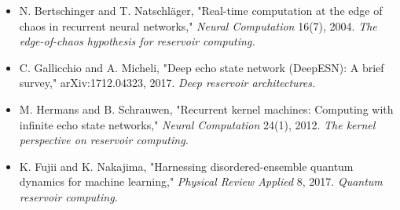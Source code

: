 \begin{itemize}[nosep]
  \item N. Bertschinger and T. Natschläger, "Real-time computation at the edge of chaos in recurrent neural networks," \textit{Neural Computation} 16(7), 2004. \textit{The edge-of-chaos hypothesis for reservoir computing.}
  \item C. Gallicchio and A. Micheli, "Deep echo state network (DeepESN): A brief survey," arXiv:1712.04323, 2017. \textit{Deep reservoir architectures.}
  \item M. Hermans and B. Schrauwen, "Recurrent kernel machines: Computing with infinite echo state networks," \textit{Neural Computation} 24(1), 2012. \textit{The kernel perspective on reservoir computing.}
  \item K. Fujii and K. Nakajima, "Harnessing disordered-ensemble quantum dynamics for machine learning," \textit{Physical Review Applied} 8, 2017. \textit{Quantum reservoir computing.}
\end{itemize}
